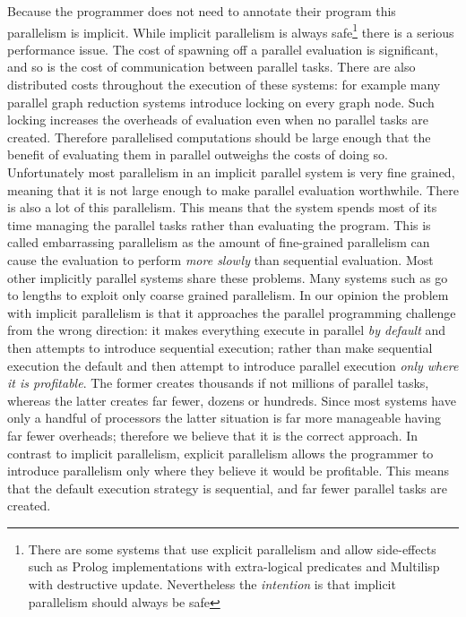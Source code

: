 Because the programmer does not need to annotate their program this
parallelism is implicit.
While implicit parallelism is always safe\footnote{
    There are some systems that use explicit parallelism and allow
    side-effects such as
    Prolog implementations with extra-logical predicates and
    Multilisp with destructive update. 
    Nevertheless the \emph{intention} is that implicit parallelism should
    always be safe}
there is a serious performance issue.
The cost of spawning off a parallel evaluation is significant,
and so is the cost of communication between parallel tasks.
There are also distributed costs throughout the execution of these systems:
for example many parallel graph reduction systems introduce locking on every
graph node.
Such locking increases the overheads of evaluation even when no parallel
tasks are created.
Therefore parallelised computations should be large enough that the benefit
of evaluating them in parallel outweighs the costs of doing so.
Unfortunately most parallelism in an implicit parallel system is very
fine grained, meaning that it is not large enough to make parallel
evaluation worthwhile.
There is also a lot of this parallelism.
This means that the system spends most of its time managing the parallel
tasks rather than evaluating the program.
This is called embarrassing parallelism as the amount of fine-grained
parallelism can cause the evaluation to perform \emph{more slowly} than
sequential evaluation.
Most other implicitly parallel systems share these problems.
Many systems such as \citet{peyton-jones:1989:parallel-graph-reduction} go
to lengths to exploit only coarse grained parallelism.
In our opinion the problem with implicit parallelism is that it approaches
the parallel programming challenge from the wrong direction:
it makes everything execute in parallel \emph{by default} and then attempts
to introduce sequential execution;
rather than make sequential execution the default and then
attempt to introduce parallel execution \emph{only where it is profitable}.
The former creates thousands if not millions of parallel tasks,
whereas the latter creates far fewer, dozens or hundreds.
Since most systems have only a handful of processors the latter situation is
far more manageable having far fewer overheads;
therefore we believe that it is the correct approach.
In contrast to implicit parallelism,
explicit parallelism allows the programmer to introduce
parallelism only where they believe it would be profitable.
This means that the default execution strategy is sequential,
and far fewer parallel tasks are created.

